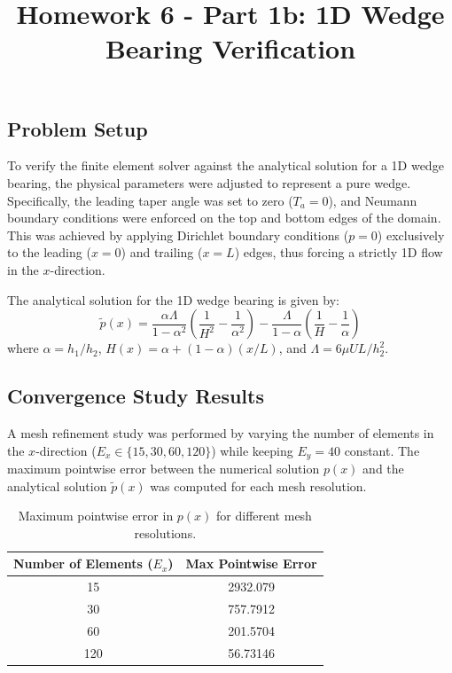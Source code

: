 \documentclass{article}
\title{Homework 6 - Part 1b: 1D Wedge Bearing Verification}
\author{}
\date{}
\begin{document}
\maketitle

\subsection*{Problem Setup}
To verify the finite element solver against the analytical solution for a 1D wedge bearing, the physical parameters were adjusted to represent a pure wedge. Specifically, the leading taper angle was set to zero ($T_a = 0$), and Neumann boundary conditions were enforced on the top and bottom edges of the domain. This was achieved by applying Dirichlet boundary conditions ($p=0$) exclusively to the leading ($x=0$) and trailing ($x=L$) edges, thus forcing a strictly 1D flow in the $x$-direction.

The analytical solution for the 1D wedge bearing is given by:
\begin{equation}
    \tilde{p}(x) = \frac{\alpha\Lambda}{1-\alpha^2}\left(\frac{1}{H^2} - \frac{1}{\alpha^2}\right) - \frac{\Lambda}{1-\alpha}\left(\frac{1}{H} - \frac{1}{\alpha}\right)
\end{equation}
where $\alpha = h_1/h_2$, $H(x) = \alpha + (1-\alpha)(x/L)$, and $\Lambda = 6\mu UL/h_2^2$.

\subsection*{Convergence Study Results}
A mesh refinement study was performed by varying the number of elements in the $x$-direction ($E_x \in \{15, 30, 60, 120\}$) while keeping $E_y = 40$ constant. The maximum pointwise error between the numerical solution $p(x)$ and the analytical solution $\tilde{p}(x)$ was computed for each mesh resolution.

\begin{table}[H]
    \centering
    \begin{tabular}{|c|c|}
        \hline
        \textbf{Number of Elements ($E_x$)} & \textbf{Max Pointwise Error} \\
        \hline
        15  & 2932.079 \\
        30  & 757.7912 \\
        60  & 201.5704 \\
        120 & 56.73146 \\
        \hline
    \end{tabular}
    \caption{Maximum pointwise error in $p(x)$ for different mesh resolutions.}
    \label{tab:convergence_data}
\end{table}
\end{document}
